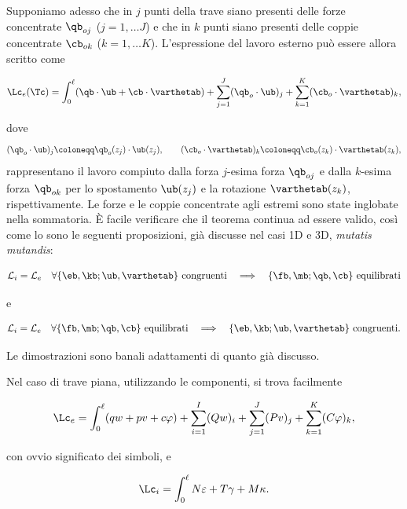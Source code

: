 Supponiamo adesso che in $j$ punti della trave siano presenti delle forze concentrate $\qb_{oj}$ ($j=1,\ldots J$) e che in $k$ punti siano presenti delle coppie concentrate $\cb_{ok}$ ($k=1,\ldots K$). L'espressione del lavoro esterno può essere allora scritto come
\begin{definition}
	\begin{equation}
\Lc_e(\Tc)=\int_0^\ell(\qb\cdot \ub+\cb\cdot \varthetab)+\sum_{j=1}^{J}(\qb_{o}\cdot\ub)_j+\sum_{k=1}^{K}(\cb_{o}\cdot\varthetab)_k,
\end{equation}
\end{definition}
dove
\begin{equation}
(\qb_{o}\cdot\ub)_j\coloneqq \qb_{o}(z_j)\cdot \ub(z_j), \qquad (\cb_{o}\cdot\varthetab)_k\coloneqq \cb_{o}(z_k)\cdot \varthetab(z_k),
\end{equation}
rappresentano il lavoro compiuto dalla forza $j$-esima forza $\qb_{oj}$ e dalla $k$-esima forza $\qb_{ok}$ per lo spostamento $\ub(z_j)$ e la rotazione $\varthetab(z_k)$, rispettivamente. Le forze e le coppie concentrate agli estremi sono state inglobate nella sommatoria.
È facile verificare che il teorema continua ad essere valido, così come lo sono  le seguenti proposizioni, già discusse nel casi 1D e 3D, \textit{mutatis mutandis}:
\begin{definition}
	\begin{equation}
		\mathcal{L}_i=\mathcal{L}_e\quad\forall\{\eb, \kb; \ub, \varthetab\}\text{ congruenti}\quad\Longrightarrow\quad\{\fb, \mb; \qb, \cb \}\text{ equilibrati}
	\end{equation}
\end{definition}
e
\begin{definition}
	\begin{equation}
		\mathcal{L}_i=\mathcal{L}_e\quad\forall\{\fb, \mb; \qb, \cb\}\text{ equilibrati}\quad\Longrightarrow\quad\{\eb, \kb; \ub, \varthetab\}\text{ congruenti.}
	\end{equation}
\end{definition}
Le dimostrazioni sono banali adattamenti di quanto già discusso.


Nel caso di trave piana, utilizzando le componenti, si trova facilmente
\begin{definition}
	\begin{equation}
\Lc_e=\int_{0}^{\ell}(q w+ p v+ c\varphi)+ \sum_{i=1}^{I}(Q w)_i+\sum_{j=1}^{J}(P v)_j+\sum_{k=1}^{K}(C \varphi)_k,
\end{equation}
\end{definition}
con ovvio significato dei simboli, e
\begin{definition}
	\begin{equation}
\Lc_i=\int_{0}^{\ell}N \varepsilon+T\gamma+ M\kappa.
\end{equation}
\end{definition}

